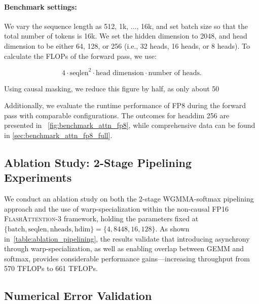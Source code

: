 \begin{enumerate}
\paragraph{Benchmark settings:} We vary the sequence length as 512, 1k, ..., 16k, and set batch size so that the total number of tokens is 16k. We set the hidden dimension to 2048, and head dimension to be either 64, 128, or 256 (i.e., 32 heads, 16 heads, or 8 heads). To calculate the FLOPs of the forward pass, we use:

\begin{equation*}
  4 \cdot \text{seqlen}^2 \cdot \text{head dimension} \cdot \text{number of heads}.
\end{equation*}

Using causal masking, we reduce this figure by half, as only about 50%

Additionally, we evaluate the runtime performance of FP8 during the forward pass with comparable configurations. The outcomes for headdim 256 are presented in ~\cref{fig:benchmark_attn_fp8}, while comprehensive data can be found in \cref{sec:benchmark_attn_fp8_full}.

\subsection{Ablation Study: 2-Stage Pipelining Experiments}
\label{sec:2-stage-pipelining-experiments}

We conduct an ablation study on both the 2-stage WGMMA-softmax pipelining approach and the use of warp-specialization within the non-causal FP16 \textsc{FlashAttention-3} framework, holding the parameters fixed at $\{\text{batch}, \text{seqlen}, \text{nheads}, \text{hdim}\} = \{ 4, 8448, 16, 128\}$. As shown in~\cref{table:ablation_pipelining}, the results validate that introducing asynchrony through warp-specialization, as well as enabling overlap between GEMM and softmax, provides considerable performance gains—increasing throughput from 570 TFLOPs to 661 TFLOPs.

\subsection{Numerical Error Validation}
\label{sec:numerical_error}


\end{enumerate}
